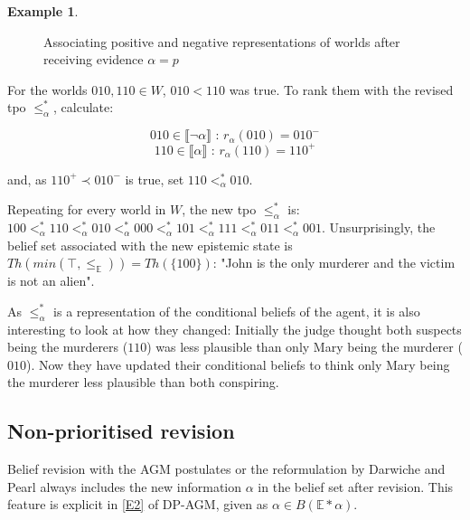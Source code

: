 \documentclass[english, 12pt]{scrartcl}
\theoremstyle{definition}
\newtheorem{example}{Example}
\theoremstyle{definition}
\theoremstyle{definition}
\newcommand{\modelsOf}[1]{\llbracket #1 \rrbracket}
\begin{document}
\begin{example}
\begin{figure}[H]
            \caption{Associating positive and negative representations of worlds after receiving evidence $\alpha=p$}
            \label{fig:example-tpo-revised}
    \end{figure}
    
    For the worlds $010, 110 \in W$, $010 < 110$ was true. To rank them with the revised tpo $\leq_{\alpha}^{\ast}$, calculate:
    
    \begin{equation*}
        010 \in \modelsOf{\neg\alpha} \textrm{ : } r_{\alpha}(010) = 010^{-}
    \end{equation*}
    \begin{equation*}
        110 \in \modelsOf{\alpha} \textrm{ : } r_{\alpha}(110) = 110^{+}
    \end{equation*}
    
    and, as $110^{+} \prec 010^{-}$ is true, set $110 <_{\alpha}^{\ast} 010$.
    
    Repeating for every world in $W$, the new tpo $\leq_{\alpha}^{\ast}$ is: $100 <_{\alpha}^{\ast} 110 <_{\alpha}^{\ast} 010 <_{\alpha}^{\ast} 000 <_{\alpha}^{\ast} 101 <_{\alpha}^{\ast} 111 <_{\alpha}^{\ast} 011 <_{\alpha}^{\ast} 001$. Unsurprisingly, the belief set associated with the new epistemic state is $Th(min(\top, \leq_{\mathbb{E}})) = Th(\{100\})$: "John is the only murderer and the victim is not an alien".
    
    As $\leq_{\alpha}^{\ast}$ is a representation of the conditional beliefs of the agent, it is also interesting to look at how they changed: Initially the judge thought both suspects being the murderers ($110$) was less plausible than only Mary being the murderer ($010$). Now they have updated their conditional beliefs to think only Mary being the murderer less plausible than both conspiring.
\end{example}

\subsection{Non-prioritised revision}
\label{section:non-prioritised-revision}

Belief revision with the AGM postulates \cite{Alchourron1985} or the reformulation by Darwiche and Pearl \cite{Darwiche1997} always includes the new information $\alpha$ in the belief set after revision. This feature is explicit in \ref{E2} of DP-AGM, given as $\alpha \in B(\mathbb{E}\ast\alpha)$.
\end{document}

